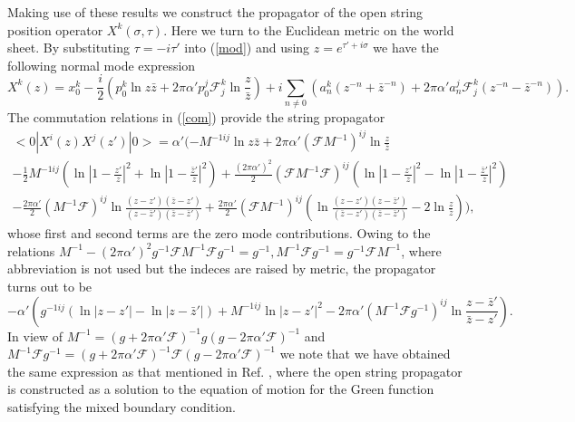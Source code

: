 \documentclass[12pt,a4paper]{article}
\newcommand{\al}{\alpha'}
\newcommand{\F}{\mathcal{F}}
\begin{document}
Making use of these results we construct the propagator of 
the open string position operator $X^k(\sigma,\tau)$. 
 Here we turn to the Euclidean metric on the world 
sheet. By substituting $\tau = -i\tau'$ into (\ref{mod}) and using $z =
e^{\tau'+i\sigma}$ we have the following normal mode expression
\begin{equation}
X^k(z) = x_0^k - \frac{i}{2}(p_0^k\ln z\bar{z} + 2\pi\al p_0^j\F_j^k
\ln \frac{z}{\bar{z}}) + i\sum_{n\neq 0} (a_n^k(z^{-n} + \bar{z}^{-n}) 
+ 2\pi\al a_n^j\F_j^k(z^{-n} - \bar{z}^{-n})).
\end{equation}
The commutation relations in (\ref{com}) provide the string propagator
\begin{eqnarray}
<0|X^i(z)X^j(z')|0> = \al ( -M^{-1ij}\ln z\bar{z} +2\pi\al(\F M^{-1})^{ij}
\ln \frac{z}{\bar{z}} \hspace{3cm} {}\nonumber \\
-\frac{1}{2}M^{-1ij}(\ln |1-\frac{z'}{z}|^2 + \ln 
|1-\frac{\bar{z}'}{z}|^2) + \frac{(2\pi\al)^2}{2}(\F M^{-1}\F)^{ij}(\ln 
|1-\frac{z'}{z}|^2 - \ln |1-\frac{\bar{z}'}{z}|^2) \\
- \frac{2\pi\al}{2}(M^{-1}\F)^{ij}\ln \frac{(z-z')(\bar{z}-z')}
{(z-\bar{z}')(\bar{z}-\bar{z}')} + \frac{2\pi\al}{2}(\F M^{-1})^{ij}(\ln
\frac{(z-z')(z-\bar{z}')}{(\bar{z}-z')(\bar{z}-\bar{z}')} - 
2\ln \frac{z}{\bar{z}})), \nonumber
\end{eqnarray}
whose first and second terms are the zero mode contributions. Owing to
 the relations $M^{-1} - (2\pi\al)^2g^{-1}\F M^{-1}\F g^{-1} = g^{-1}, 
M^{-1}\F g^{-1} = g^{-1}\F M^{-1}$, where abbreviation is not used but the
indeces are raised by metric, the propagator turns out to be
\begin{equation}
-\al(g^{-1ij}(\ln|z-z'|-\ln|z-\bar{z}'|) + M^{-1ij}\ln|z-z'|^2
-2\pi\al(M^{-1}\F g^{-1})^{ij}\ln\frac{z-\bar{z}'}{\bar{z}-z'}).
\label{pro}\end{equation}
In view of $M^{-1} = (g+2\pi\al \F)^{-1}g(g-2\pi\al\F)^{-1}$ and 
$M^{-1}\F g^{-1} = (g+2\pi\al\F)^{-1}\F(g-2\pi\al\F)^{-1}$ we note that we
have obtained the same expression as that mentioned in Ref. \cite{SW},
where the open string propagator is constructed as a solution to 
the equation of motion for the Green function satisfying the 
mixed boundary condition.
\end{document}
